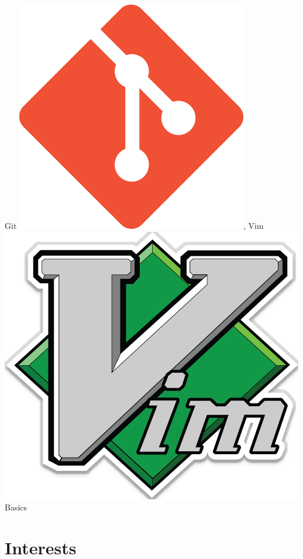 \documentclass[11pt,a4paper,sans]{moderncv}
\begin{document}
{Git \includegraphics[height=1.4\fontcharht\font`\B]{git_logo.png}, %
Vim \includegraphics[height=1.4\fontcharht\font`\B]{vim_logo.png}%
}{Basics}
%
%
%
\section{Interests}
%
%
%
\clearpage
%
\end{document}
